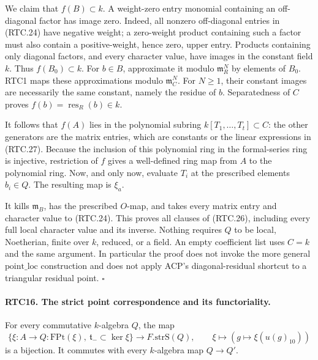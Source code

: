 \documentclass[11pt,a4paper]{article}
\numberwithin{equation}{section}
\theoremstyle{remark}\newtheorem{remark}[theorem]{Remark}
\begin{document}
We claim that \(f(B)\subset k\).  A weight-zero entry monomial
containing an off-diagonal factor has image zero.  Indeed, all
nonzero off-diagonal entries in (RTC.24) have negative weight;
a zero-weight product containing such a factor must also contain
a positive-weight, hence zero, upper entry.  Products containing
only diagonal factors, and every character value, have images in
the constant field \(k\).  Thus \(f(B_0)\subset k\).
For \(b\in B\), approximate it modulo \(\mathfrak m_R^N\)
by elements of \(B_0\).  RTC1 maps these approximations modulo
\(\mathfrak m_C^N\).  For \(N\geq1\), their constant images
are necessarily the same constant, namely the residue of \(b\).
Separatedness of \(C\) proves
\(f(b)=\operatorname{res}_R(b)\in k\).

It follows that \(f(A)\) lies in the polynomial subring
\(k[T_1,\ldots,T_t]\subset C\): the other generators are the
matrix entries, which are constants or the linear expressions
in (RTC.27).  Because the inclusion of this polynomial ring in
the formal-series ring is injective, restriction of \(f\) gives
a well-defined ring map from \(A\) to the polynomial ring.
Now, and only now, evaluate \(T_i\) at the prescribed elements
\(b_i\in Q\).  The resulting map is \(\xi_a\).

It kills \(\mathfrak m_B\), has the prescribed \(O\)-map,
and takes every matrix entry and character value to (RTC.24).
This proves all clauses of (RTC.26), including every full local
character value and its inverse.  Nothing requires \(Q\) to be
local, Noetherian, finite over \(k\), reduced, or a field.
An empty coefficient list uses \(C=k\) and the same argument.
In particular the proof does not invoke the more general
\(\mathrm{point\_\allowbreak loc}\) construction and does not apply ACP's
diagonal-residual shortcut to a triangular residual point.
\hfill\(\square\)

\paragraph{RTC16. The strict point correspondence and its functoriality.}
\label{claim:RTC16}
For every commutative \(k\)-algebra \(Q\), the map
\[
 \{\xi:A\to Q:\mathrm{FPt}(\xi),\
                   \mathfrak t_-\subset\ker\xi\}
   \longrightarrow F.\mathrm{strS}(Q),\qquad
       \xi\longmapsto(g\mapsto\xi(u(g)_{10}))
                                                        \tag{RTC.28}
\]
is a bijection.  It commutes with every \(k\)-algebra map
\(Q\to Q'\).
\end{document}

